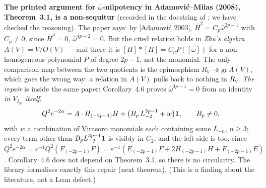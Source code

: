 \begin{warning}
\textbf{The printed argument for $\bar\omega$-nilpotency in Adamovi\'c--Milas (2008), Theorem~3.1, is
a non-sequitur} (recorded in the docstring of ; we have checked the
reasoning). The paper says: by [Adamovi\'c 2003], $\bar H^2=C_p\bar\omega^{2p-1}$ with $C_p\ne0$; since
$\bar H^4=0$, $\bar\omega^{4p-2}=0$. But the cited relation holds in \emph{Zhu's algebra} $A(V)=V/O(V)$
--- and there it is $[H]*[H]=C_pP([\omega])$ for a non-homogeneous polynomial $P$ of degree $2p-1$,
not the monomial. The only comparison map between the two quotients is the epimorphism
$R_V\twoheadrightarrow\mathrm{gr}\,A(V)$, which goes the wrong way: a relation in $A(V)$ pulls back to
nothing in $R_V$. \emph{The repair} is inside the same paper: Corollary~4.6 proves
$\bar\omega^{3p-1}=0$ from an identity \emph{in $V_{L_p}$ itself},
\begin{equation}\label{l18:eq:AMid}
Q^2e^{-2\alpha}=A\cdot H_{(-2p-1)}H+\bigl(B_p\,L_{-2}^{3p-1}+w\bigr)\mathbf{1},\qquad B_p\ne0,
\end{equation}
with $w$ a combination of Virasoro monomials each containing some $L_{-n}$, $n\ge3$; every term other
than $B_pL_{-2}^{3p-1}\mathbf{1}$ is visibly in $C_2$, and the left side is too, since
$Q^2e^{-2\alpha}=\varepsilon^{-1}Q^2(F_{(-2p-1)}F)=\varepsilon^{-1}(E_{(-2p-1)}F+2H_{(-2p-1)}H+F_{(-2p-1)}E)$.
Corollary~4.6 does not depend on Theorem~3.1, so there is no circularity. The library formalises
exactly this repair (next theorem). (This is a finding about the literature, not a Lean defect.)
\end{warning}

